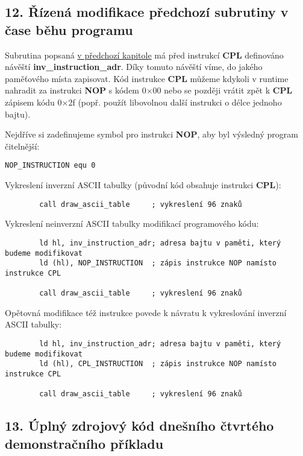 \documentclass{article}
\begin{document}
\hypertarget{k12}{%
\subsection{12. Řízená modifikace předchozí subrutiny v čase běhu
programu}\label{k12}}

Subrutina popsaná \protect\hyperlink{k11}{v předchozí kapitole} má před
instrukcí \textbf{CPL} definováno návěští
\textbf{inv\_instruction\_adr}. Díky tomuto návěští víme, do jakého
paměťového místa zapisovat. Kód instrukce \textbf{CPL} můžeme kdykoli v
runtime nahradit za instrukci \textbf{NOP} s kódem 0×00 nebo se později
vrátit zpět k \textbf{CPL} zápisem kódu 0×2f (popř. použít libovolnou
další instrukci o délce jednoho bajtu).

Nejdříve si zadefinujeme symbol pro instrukci \textbf{NOP}, aby byl
výsledný program čitelnější:

\begin{verbatim}
NOP_INSTRUCTION equ 0
\end{verbatim}

Vykreslení inverzní ASCII tabulky (původní kód obsahuje instrukci
\textbf{CPL}):

\begin{verbatim}
        call draw_ascii_table     ; vykreslení 96 znaků
\end{verbatim}

Vykreslení neinverzní ASCII tabulky modifikací programového kódu:

\begin{verbatim}
        ld hl, inv_instruction_adr; adresa bajtu v paměti, který budeme modifikovat
        ld (hl), NOP_INSTRUCTION  ; zápis instrukce NOP namísto instrukce CPL
 
        call draw_ascii_table     ; vykreslení 96 znaků
\end{verbatim}

Opětovná modifikace též instrukce povede k návratu k vykreslování
inverzní ASCII tabulky:

\begin{verbatim}
        ld hl, inv_instruction_adr; adresa bajtu v paměti, který budeme modifikovat
        ld (hl), CPL_INSTRUCTION  ; zápis instrukce NOP namísto instrukce CPL
 
        call draw_ascii_table     ; vykreslení 96 znaků
\end{verbatim}

\hypertarget{k13}{%
\subsection{13. Úplný zdrojový kód dnešního čtvrtého demonstračního
příkladu}\label{k13}}
\end{document}
